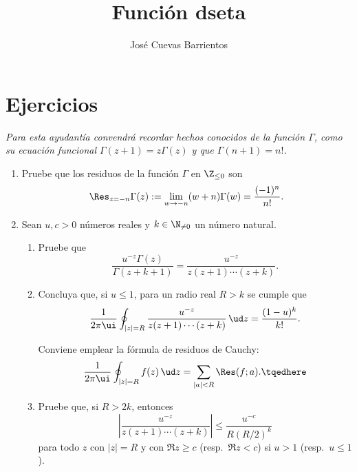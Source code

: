 \documentclass[11pt, reqno]{amsart}
\title{Función dseta}
\date{\DTMdate{2025-10-17}}
\author[José Cuevas]{José Cuevas Barrientos}
\begin{document}
\maketitle

\section{Ejercicios}
\begin{center}
	\slshape
	Para esta ayudantía convendrá recordar hechos conocidos de la función $\Gamma$, como su ecuación funcional $\Gamma(z + 1) = z \Gamma(z)$ y que $\Gamma(n + 1) = n!$.
\end{center}
\begin{enumerate}
	\item Pruebe que los residuos de la función $\Gamma$ en $\Z_{\le 0}$ son
		\[
			\Res_{z=-n} \Gamma(z) := \lim_{w \to -n} (w + n)\Gamma(w) = \frac{(-1)^n}{n!}.
		\]

	\item Sean $u, c > 0$ números reales y $k \in \N_{\ne 0}$ un número natural.
		\begin{enumerate}
			\item Pruebe que
				\[
					\frac{u^{-z} \Gamma(z)}{\Gamma(z + k + 1)} = \frac{u^{-z}}{z(z + 1) \cdots (z + k)}.
				\]

			\item Concluya que, si $u \le 1$, para un radio real $R > k$ se cumple que
				\[
					\frac{1}{2\pi\ui}\oint_{|z|=R} \frac{u^{-z}}{z(z + 1) \cdots (z + k)} \, \ud z = \dfrac{(1 -
					u)^k}{k!}.
				\]
				\begin{hint}
					Conviene emplear la fórmula de residuos de Cauchy:
					\begin{equation}
						\frac{1}{2\pi\ui}\oint_{|z|=R} f(z) \, \ud z = \sum_{|a|<R} \Res(f; a).
						\tqedhere
					\end{equation}
				\end{hint}

			\item Pruebe que, si $R > 2k$, entonces
				\[
					\left\lvert\frac{u^{-z}}{z(z + 1)\cdots(z + k)}\right\rvert
					\le \frac{u^{-c}}{R(R/2)^k}
				\]
				para todo $z$ con $|z| = R$ y con $\Re z \ge c$ (resp.\ $\Re z < c$) si $u > 1$ (resp.\ $u \le 1$).


\end{enumerate}
\end{enumerate}
\end{document}
